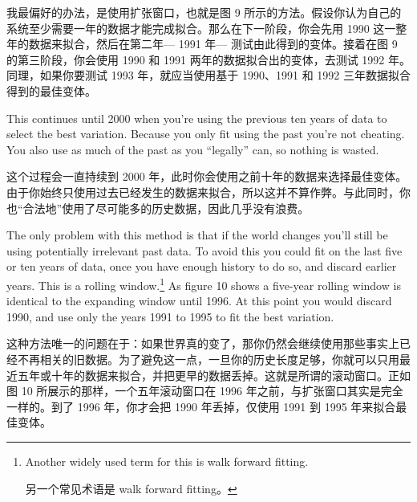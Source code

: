 \begin{chineseblock}我最偏好的办法，是使用扩张窗口，也就是图 9 所示的方法。假设你认为自己的系统至少需要一年的数据才能完成拟合。那么在下一阶段，你会先用 1990 这一整年的数据来拟合，然后在第二年--- 1991 年--- 测试由此得到的变体。接着在图 9 的第三阶段，你会使用 1990 和 1991 两年的数据拟合出的变体，去测试 1992 年。同理，如果你要测试 1993 年，就应当使用基于 1990、1991 和 1992 三年数据拟合得到的最佳变体。\end{chineseblock}

\bipairgap

\begin{englishblock} This continues until 2000 when you're using the previous ten years of data to select the best variation. Because you only fit using the past you're not cheating. You also use as much of the past as you ``legally'' can, so nothing is wasted. \end{englishblock}

\begin{chineseblock}这个过程会一直持续到 2000 年，此时你会使用之前十年的数据来选择最佳变体。由于你始终只使用过去已经发生的数据来拟合，所以这并不算作弊。与此同时，你也“合法地”使用了尽可能多的历史数据，因此几乎没有浪费。\end{chineseblock}

\bipairgap

\begin{englishblock} The only problem with this method is that if the world changes you'll still be using potentially irrelevant past data. To avoid this you could fit on the last five or ten years of data, once you have enough history to do so, and discard earlier years. This is a rolling window.\footnote{Another widely used term for this is walk forward fitting. \par 另一个常见术语是 walk forward fitting。} As figure 10 shows a five-year rolling window is identical to the expanding window until 1996. At this point you would discard 1990, and use only the years 1991 to 1995 to fit the best variation. \end{englishblock}

\begin{chineseblock}这种方法唯一的问题在于：如果世界真的变了，那你仍然会继续使用那些事实上已经不再相关的旧数据。为了避免这一点，一旦你的历史长度足够，你就可以只用最近五年或十年的数据来拟合，并把更早的数据丢掉。这就是所谓的滚动窗口。正如图 10 所展示的那样，一个五年滚动窗口在 1996 年之前，与扩张窗口其实是完全一样的。到了 1996 年，你才会把 1990 年丢掉，仅使用 1991 到 1995 年来拟合最佳变体。\end{chineseblock}

